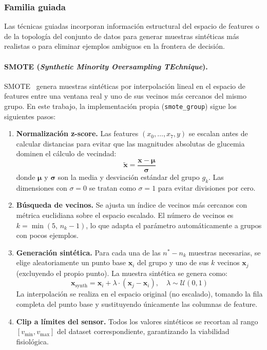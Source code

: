 \subsubsection{Familia guiada}
\label{subsubsec:familia_guiada}

Las técnicas guiadas incorporan información estructural del espacio de features o de la topología del conjunto de datos para generar muestras sintéticas más realistas o para eliminar ejemplos ambiguos en la frontera de decisión.

\paragraph{SMOTE (\emph{Synthetic Minority Oversampling TEchnique}).}
SMOTE~\cite{chawla2002smote} genera muestras sintéticas por interpolación lineal en el espacio de features entre una ventana real y uno de sus vecinos más cercanos del mismo grupo. En este trabajo, la implementación propia (\texttt{smote\_group}) sigue los siguientes pasos:

\begin{enumerate}
  \item \textbf{Normalización z-score.} Las features $(x_0, \ldots, x_7, y)$ se escalan antes de calcular distancias para evitar que las magnitudes absolutas de glucemia dominen el cálculo de vecindad:
  \begin{equation}
    \tilde{\mathbf{x}} = \frac{\mathbf{x} - \boldsymbol{\mu}}{\boldsymbol{\sigma}}
    \label{eq:smote_zscore}
  \end{equation}
  donde $\boldsymbol{\mu}$ y $\boldsymbol{\sigma}$ son la media y desviación estándar del grupo $g_k$. Las dimensiones con $\sigma = 0$ se tratan como $\sigma = 1$ para evitar divisiones por cero.

  \item \textbf{Búsqueda de vecinos.} Se ajusta un índice de vecinos más cercanos con métrica euclidiana sobre el espacio escalado. El número de vecinos es $k = \min(5,\, n_k - 1)$, lo que adapta el parámetro automáticamente a grupos con pocos ejemplos.

  \item \textbf{Generación sintética.} Para cada una de las $n^* - n_k$ muestras necesarias, se elige aleatoriamente un punto base $\mathbf{x}_i$ del grupo y uno de sus $k$ vecinos $\mathbf{x}_j$ (excluyendo el propio punto). La muestra sintética se genera como:
  \begin{equation}
    \mathbf{x}_\text{synth} = \mathbf{x}_i + \lambda \cdot (\mathbf{x}_j - \mathbf{x}_i), \quad \lambda \sim \mathcal{U}(0, 1)
    \label{eq:smote_interp}
  \end{equation}
  La interpolación se realiza en el espacio original (no escalado), tomando la fila completa del punto base y sustituyendo únicamente las columnas de feature.

  \item \textbf{Clip a límites del sensor.} Todos los valores sintéticos se recortan al rango $[v_\text{min}, v_\text{max}]$ del dataset correspondiente, garantizando la viabilidad fisiológica.
\end{enumerate}

